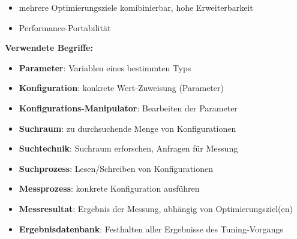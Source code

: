 \begin{frame}
\begin{itemize}
      \item mehrere Optimierungsziele komibinierbar, hohe Erweiterbarkeit
      
       \item Performance-Portabilität
                  
    \end{itemize}
    \end{frame}
    \endgroup
    
  \begingroup
  \begin{frame}
    \textbf{Verwendete Begriffe:}
    
  \begin{itemize}

    \item \textbf{Parameter}: Variablen eines bestimmten Typs 
    
    \item \textbf{Konfiguration}: konkrete Wert-Zuweisung (Parameter)
    \item \textbf{Konfigurations-Manipulator}: Bearbeiten der Parameter \newline
    
    \item \textbf{Suchraum}: zu durchsuchende Menge von Konfigurationen
    
    \item \textbf{Suchtechnik}: Suchraum erforschen, Anfragen für Messung
    \item \textbf{Suchprozess}: Lesen/Schreiben von Konfigurationen \newline
    
    \item \textbf{Messprozess}: konkrete Konfiguration ausführen
    \item \textbf{Messresultat}: Ergebnis der Messung, abhängig von Optimierungsziel(en)
    \item \textbf{Ergebnisdatenbank}: Festhalten aller Ergebnisse des Tuning-Vorgangs
    
  \end{itemize}
  \end{frame}
  \endgroup
        

